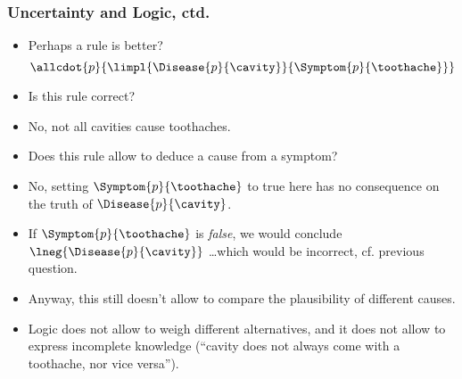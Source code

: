 \documentclass[notes,mh]{mikoslides}
\begin{document}
\begin{module}[id=uncert-logic]
\begin{frame}[label=slide.uncert-logic2]
  \frametitle{Uncertainty and Logic, ctd.}
  \begin{itemize}
  \item
    \begin{omtext}[title=Attempt 3]
      Perhaps a  rule is better?
      \[\allcdot{p}{\limpl{\Disease{p}{\cavity}}{\Symptom{p}{\toothache}}}\]
    \end{omtext}
  \item
    \begin{omtext}[title=Question]
      Is this rule correct? \pause
    \end{omtext}
  \item
    \begin{omtext}[title=Answer]
      No, not all cavities cause toothaches.
    \end{omtext}
  \item
    \begin{omtext}[title=Question]
      Does this rule allow to deduce a cause from a symptom?  \pause
    \end{omtext}
  \item
    \begin{omtext}[title=Answer]
      No, setting $\Symptom{p}{\toothache}$ to true here has no consequence on the truth
      of $\Disease{p}{\cavity}$. \pause
    \end{omtext}
  \item
    \begin{omtext}[title=Note]
      If $\Symptom{p}{\toothache}$ is \emph{false}, we would conclude
      $\lneg{\Disease{p}{\cavity}}$ \dots which would be incorrect, cf.  previous
      question.  \pause
    \end{omtext}
  \item Anyway, this still doesn't allow to compare the plausibility of different causes.
  \item Logic does not allow to weigh different alternatives, and it does not allow to
    express incomplete knowledge (``cavity does not always come with a toothache, nor vice
    versa'').
  \end{itemize}
\end{frame}
\end{module}
\end{document}
